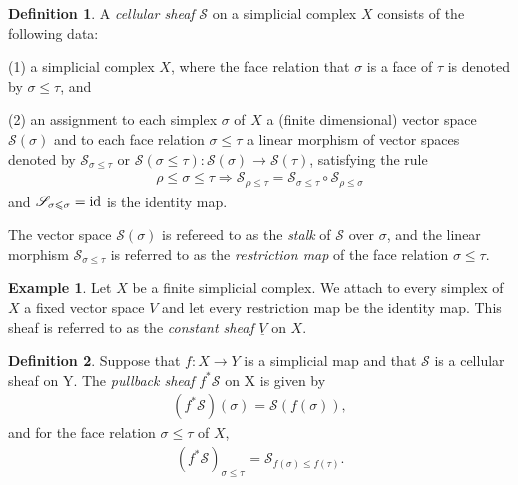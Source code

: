 \documentclass[11pt]{article}
\theoremstyle{definition}
\newtheorem{definition}{Definition}[section]
\theoremstyle{definition}
\newtheorem{example}{Example}[section]
\begin{document}
\begin{definition}
    A \emph{cellular sheaf} $\mathscr{S}$ on a simplicial complex $X$ consists of the following data:
 
    (1) a simplicial complex $X$, where the face relation that
    $\sigma$ is a face of $\tau$ is denoted by $\sigma \leqslant \tau$, and 

    (2) an assignment to each simplex $\sigma$ of $X$ a (finite dimensional) vector space $\mathscr{S}(\sigma)$
    and to each face relation $\sigma \leqslant \tau$ a linear morphism of vector spaces denoted by
    $\mathscr{S}_{\sigma \leqslant \tau}$
    or $\mathscr{S}(\sigma \leqslant \tau): \mathscr{S}(\sigma) \to \mathscr{S}(\tau)$, satisfying the rule 
    \begin{align*}
        \rho \leqslant \sigma \leqslant \tau \Rightarrow \mathscr{S}_{\rho \leqslant \tau} =   \mathscr{S}_{\sigma \leqslant \tau} \circ \mathscr{S}_{\rho \leqslant \sigma}
    \end{align*}
    and $\mathscr{S}_{\sigma \leqslant \sigma}={\rm id}$ is the identity map. 

    The vector space $\mathscr{S}(\sigma)$ is refereed to as the \emph{stalk} of $\mathscr{S}$ over $\sigma$, and the linear morphism 
    $\mathscr{S}_{\sigma \leqslant \tau}$ is referred to as the \emph{restriction map} of the face relation $\sigma \leqslant \tau$. 
\end{definition}

\begin{example}
    Let $X$ be a finite simplicial complex. 
    We attach to every simplex of $X$ a fixed vector space $V$ and let every restriction map be the identity map. 
    This sheaf is referred to as the \emph{constant sheaf} $\underline{V}$ on $X$.
\end{example}

\begin{definition}
    Suppose that $f: X \to Y$ is a simplicial map \cite{Munkres1984} and that $\mathscr{S}$ is a cellular sheaf on Y. The \emph{pullback sheaf} $f^{\ast} \mathscr{S}$ on X is
    given by 
    \begin{align*}
        (f^{\ast} \mathscr{S})(\sigma) = \mathscr{S}(f(\sigma)),
    \end{align*}
    and for the face relation $\sigma \leqslant \tau$ of $X$,
    \begin{align*}
        (f^{\ast}\mathscr{S})_{\sigma \leqslant \tau} = \mathscr{S}_{f(\sigma) \leqslant f(\tau)}. 
    \end{align*}
\end{definition}
\end{document}
